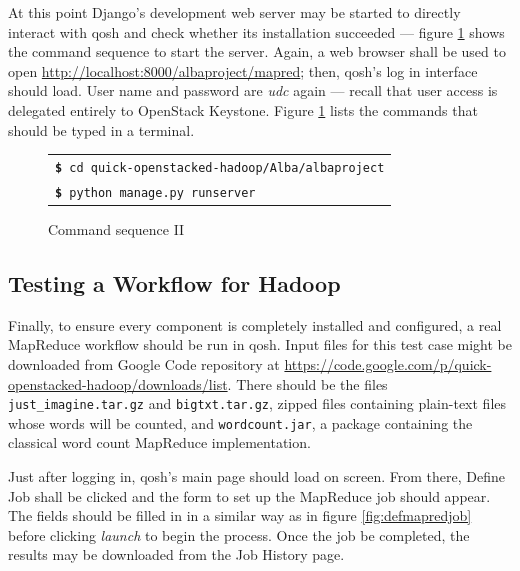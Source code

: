 At this point Django's development web server may be started to directly interact with qosh and check whether its installation succeeded --- figure \ref{fig:comandosshell2} shows the command sequence to start the server. Again, a web browser shall be used to open \url{http://localhost:8000/albaproject/mapred}; then, qosh's log in interface should load. User name and password are \emph{udc} again --- recall that user access is delegated entirely to OpenStack Keystone. Figure \ref{fig:comandosshell2} lists the commands that should be typed in a terminal.

\begin{figure}[tbp]
    \begin{center}
        \begin{tabular}{|l|}
            \hline
            \texttt{{\bf \$} cd quick-openstacked-hadoop/Alba/albaproject} \\
            \texttt{{\bf \$} python manage.py runserver} \\
            \hline
        \end{tabular}
        \caption{Command sequence II}
        \label{fig:comandosshell2}
    \end{center}
\end{figure}

\subsection{Testing a Workflow for Hadoop}\label{subsec:flujohadoop}
\noindent Finally, to ensure every component is completely installed and configured, a real MapReduce workflow should be run in qosh. Input files for this test case might be downloaded from Google Code repository at \url{https://code.google.com/p/quick-openstacked-hadoop/downloads/list}. There should be the files \texttt{just\_imagine.tar.gz} and \texttt{bigtxt.tar.gz}, zipped files containing plain-text files whose words will be counted, and \texttt{wordcount.jar}, a package containing the classical word count MapReduce implementation.

Just after logging in, qosh's main page should load on screen. From there, Define Job shall be clicked and the form to set up the MapReduce job should appear. The fields should be filled in in a similar way as in figure \ref{fig:defmapredjob} before clicking \emph{launch} to begin the process. Once the job be completed, the results may be downloaded from the Job History page.


